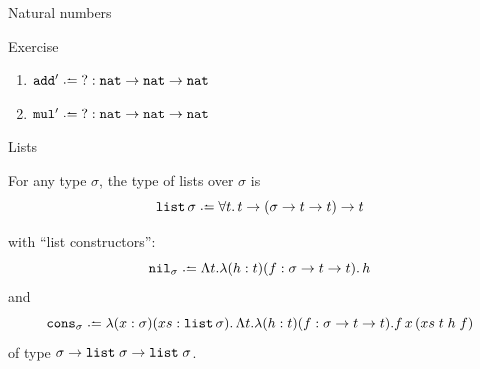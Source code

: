 \begin{frame}[allowframebreaks]{Natural numbers}
\begin{block}{Exercise}
  \begin{enumerate}
    \item $\add'\defeq \;? : \nat\to\nat\to\nat$
    \item $\mul'\defeq \;? : \nat\to\nat\to\nat$
  \end{enumerate}
\end{block}
\end{frame}

\begin{frame}{Lists}
\begin{definition}
  For any type $\sigma$, the type of lists over $\sigma$ is 
\[
  \List\,\sigma\defeq \forall t.\, t \to (\sigma \to t \to t) \to t 
\]
\end{definition}
with ``list constructors'':
\[
  \mathtt{nil}_\sigma \defeq \Lambda t.\lambda (h : t)(f : \sigma\to t \to t).\,
  h
\]
and  
\[
  \mathtt{cons}_\sigma \defeq \lambda (x : \sigma)(xs : \List\,
  \sigma).\,\Lambda t.\lambda(h : t)(f : \sigma\to t \to t).f\,x\,(xs\; t\;
  h\; f)
\]
of type $\sigma \to \mathtt{list}\;\sigma \to \mathtt{list}\;\sigma$.


\end{frame}

